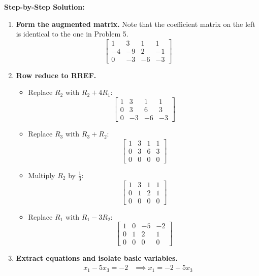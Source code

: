 \documentclass[11pt]{article}
\begin{document}
\textbf{Step-by-Step Solution:}
\begin{enumerate}
    \item \textbf{Form the augmented matrix.} Note that the coefficient matrix on the left is identical to the one in Problem 5.
    \[
    \left[ \begin{array}{ccc|c}
    1 & 3 & 1 & 1 \\
    -4 & -9 & 2 & -1 \\
    0 & -3 & -6 & -3
    \end{array} \right]
    \]
    \item \textbf{Row reduce to RREF.}
    \begin{itemize}
        \item Replace $R_2$ with $R_2 + 4R_1$:
        \[
        \left[ \begin{array}{ccc|c}
        1 & 3 & 1 & 1 \\
        0 & 3 & 6 & 3 \\
        0 & -3 & -6 & -3
        \end{array} \right]
        \]
        \item Replace $R_3$ with $R_3 + R_2$:
        \[
        \left[ \begin{array}{ccc|c}
        1 & 3 & 1 & 1 \\
        0 & 3 & 6 & 3 \\
        0 & 0 & 0 & 0
        \end{array} \right]
        \]
        \item Multiply $R_2$ by $\frac{1}{3}$:
        \[
        \left[ \begin{array}{ccc|c}
        1 & 3 & 1 & 1 \\
        0 & 1 & 2 & 1 \\
        0 & 0 & 0 & 0
        \end{array} \right]
        \]
        \item Replace $R_1$ with $R_1 - 3R_2$:
        \[
        \left[ \begin{array}{ccc|c}
        1 & 0 & -5 & -2 \\
        0 & 1 & 2 & 1 \\
        0 & 0 & 0 & 0
        \end{array} \right]
        \]
    \end{itemize}
    \item \textbf{Extract equations and isolate basic variables.}
    \begin{align*}
        x_1 - 5x_3 = -2 &\implies x_1 = -2 + 5x_3 \\

\end{align*}
\end{enumerate}
\end{document}
